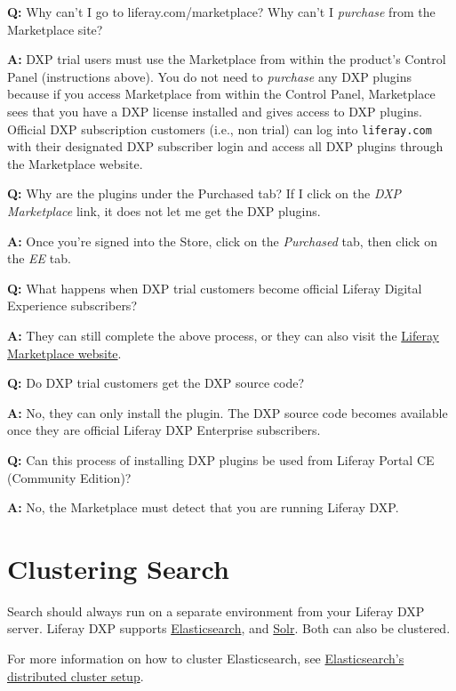 \textbf{Q:} Why can't I go to liferay.com/marketplace? Why can't I
\emph{purchase} from the Marketplace site?

\textbf{A:} DXP trial users must use the Marketplace from within the
product's Control Panel (instructions above). You do not need to
\emph{purchase} any DXP plugins because if you access Marketplace from
within the Control Panel, Marketplace sees that you have a DXP license
installed and gives access to DXP plugins. Official DXP subscription
customers (i.e., non trial) can log into \texttt{liferay.com} with their
designated DXP subscriber login and access all DXP plugins through the
Marketplace website.

\textbf{Q:} Why are the plugins under the Purchased tab? If I click on
the \emph{DXP Marketplace} link, it does not let me get the DXP plugins.

\textbf{A:} Once you're signed into the Store, click on the
\emph{Purchased} tab, then click on the \emph{EE} tab.

\textbf{Q:} What happens when DXP trial customers become official
Liferay Digital Experience subscribers?

\textbf{A:} They can still complete the above process, or they can also
visit the \href{https://www.liferay.com/marketplace}{Liferay Marketplace
website}.

\textbf{Q:} Do DXP trial customers get the DXP source code?

\textbf{A:} No, they can only install the plugin. The DXP source code
becomes available once they are official Liferay DXP Enterprise
subscribers.

\textbf{Q:} Can this process of installing DXP plugins be used from
Liferay Portal CE (Community Edition)?

\textbf{A:} No, the Marketplace must detect that you are running Liferay
DXP.

\chapter{Clustering Search}\label{clustering-search}

Search should always run on a separate environment from your Liferay DXP
server. Liferay DXP supports
\href{/docs/7-2/deploy/-/knowledge_base/d/installing-elasticsearch}{Elasticsearch},
and \href{/docs/7-2/deploy/-/knowledge_base/d/installing-solr}{Solr}.
Both can also be clustered.

For more information on how to cluster Elasticsearch, see
\href{https://www.elastic.co/guide/en/elasticsearch/guide/current/distributed-cluster.html}{Elasticsearch's
distributed cluster setup}.

